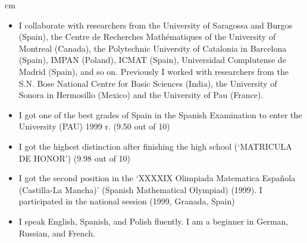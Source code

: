 \documentclass[12pt,reqno]{amsbook}
\begin{document}
 cm
\begin{itemize}
\item I collaborate with researchers from the University of Saragossa and Burgos (Spain), the Centre de Recherches Math\'ematiques of the University of Montreal (Canada), the Polytechnic University of Catalonia in Barcelona (Spain), IMPAN (Poland), ICMAT (Spain), Universidad Complutense de Madrid (Spain), and so on. Previously I worked with researchers from the S.N. Bose National Centre for Basic Sciences (India), the University of Sonora in Hermosillo (Mexico) and the University of Pau (France).


\item I got one of the best grades of Spain in the Spanish Examination to enter the University  (PAU) 1999 r. (9.50 out of 10)
\item I got the highest distinction after finishing the high school (`MATRICULA DE HONOR') (9.98 out of 10)
\item I got the second position in the `XXXXIX Olimpiada Matematica Espa\~nola (Castilla-La Mancha)' (Spanish Mathematical Olympiad) (1999). I participated in the national session (1999, Granada, Spain)
\item I speak English, Spanish, and Polish fluently. I am a beginner in German, Russian, and French.
\end{itemize}
\end{document}
